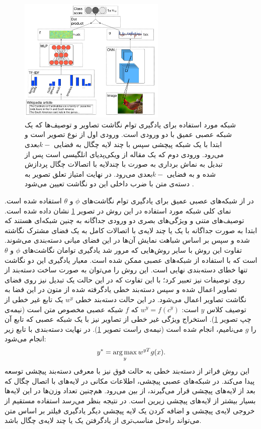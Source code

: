 \begin{figure}[th] 
\begin{center}
\includegraphics[width=7cm]{images/ba.jpg}
\end{center}
\caption[نمای کلی روش \cite{ba2015}]{
 شبکه مورد استفاده برای یادگیری توام نگاشت تصاویر و توصیف‌ها که یک شبکه عصبی عمیق با دو ورودی است. ورودی اول از نوع تصویر است و ابتدا با یک شبکه پیچشی سپس با چند لایه چگال به فضایی $k-$بعدی می‌رود. ورودی دوم که یک مقاله از ویکی‌پدیای انلگیسی است پس از تبدیل به نماش برداری به صورت  با چندلایه با اتصالات چگال پردازش شده و به فضایی $k-$بعدی می‌رود. در نهایت امتیاز تعلق تصویر به دسته‌ی متن با ضرب داخلی این دو نگاشت تعیین می‌شود \cite{ba2015}.
}
\label{fig:deep}
\end{figure}

در  \cite{ba2015} از شبکه‌های عصبی عمیق برای یادگیری توام نگاشت‌های $\phi$ و $\theta$ استفاده شده است. نمای کلی شبکه مورد استفاده در این روش در تصویر
\ref{fig:deep}
نشان داده شده است. توصیف‌های متنی و ويژگی‌های بصری دو ورودی جداگانه به چنین شبکه‌ای هستند که ابتدا به صورت جداگانه با یک یا چند لایه‌ی با اتصالات کامل به یک فضای مشترک نگاشته شده و سپس بر اساس شباهت نمایش آن‌ها در این فضای میانی دسته‌بندی می‌شوند. تفاوت این روش با سایر روش‌هایی که مرور شد یادگیری توامان نگاشت‌های  $\phi$ و $\theta$ است که با استفاده از شبکه‌های عصبی ممکن شده است. معیار یادگیری این دو نگاشت تنها خطای دسته‌بندی نهایی است.
این روش را می‌توان به صورت ساخت دسته‌بند از روی توصیفات نیز تعبیر کرد؛ با این تفاوت که در این حالت یک تبدیل نیز روی فضای تصاویر اعمال شده و سپس دسته‌بند خطی یادگرفته شده از متون در این فضا به نگاشت تصاویر اعمال می‌شود. در این حالت دسته‌بند خطی $w^y$ یک تابع غیر خطی از توصیف کلاس $y$ است: $w^y = f(c^y)$ که $f$ شبکه عصبی مخصوص متن است (نیمه‌ی چپ تصویر \ref{fig:deep}). استخراج ویژگی غیر خطی از تصاویر نیز با یک شبکه عصبی که تابع آن را $g$ می‌نامیم، انجام شده است (نیمه‌ی راست تصویر \ref{fig:deep}). در نهایت دسته‌بندی با تابع زیر انجام می‌شود:
\begin{equation} \label{eq:ba_classifier}
y^* = \operatorname*{arg\,max}_y{w^{yT} g(x)}.
\end{equation}
این روش فراتر از دسته‌بند خطی به حالت فوق نیز با معرفی دسته‌بند پیچشی توسعه پیدا می‌کند. در شبکه‌های عصبی پیچشی، اطلاعات مکانی در  لایه‌های با اتصال چگال که بعد از لایه‌های پیچشی قرار می‌گیرند، از بین می‌رود. هم‌چنین تعداد وزن‌ها در این لایه‌ها بسیار بیشتر از لایه‌های پیچشی زیرین است. در نتیجه بنظر می‌رسد استفاده مستقیم از خروجی لایه‌ی پیچشی و اضافه کردن یک لایه پیچشی دیگر یادگیری فیلتر بر اساس متن می‌تواند راه‌حل مناسب‌تری از یادگرفتن یک یا چند لایه‌ی چگال باشد.

